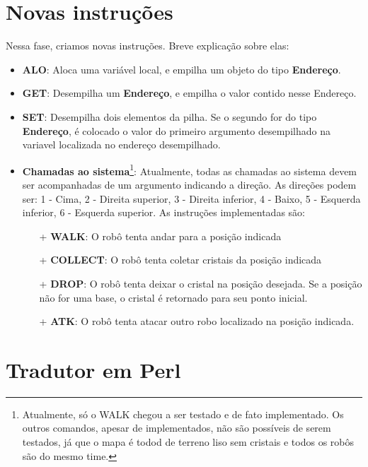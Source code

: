 \documentclass[11pt]{article}
\begin{document}
\section{Novas instruções}

Nessa fase, criamos novas instruções. Breve explicação sobre elas:

\begin{itemize}

	\item \textbf{ALO}: Aloca uma variável local, e empilha um objeto do tipo \textbf{\color{red}Endereço}.
	\item \textbf{GET}: Desempilha um \textbf{\color{red}Endereço}, e empilha o valor contido nesse Endereço.
	\item \textbf{SET}: Desempilha dois elementos da pilha. Se o segundo for do tipo \textbf{\color{red}Endereço},
	é colocado o valor do primeiro argumento desempilhado na variavel localizada no endereço desempilhado.
	\item \textbf{Chamadas ao sistema}\footnote{Atualmente, só o WALK chegou a ser testado e de fato implementado. Os outros comandos, apesar de implementados, não são possíveis de serem testados, já que o mapa é todod de terreno liso sem cristais e todos os robôs são do mesmo time.}: Atualmente, todas as chamadas ao sistema devem ser acompanhadas de um argumento indicando a direção. As direções podem ser: 1 - Cima, 2 - Direita superior, 3 - Direita inferior, 4 - Baixo, 5 - Esquerda inferior, 6 - Esquerda superior. As instruções implementadas são:
		\begin{itemize}

		\item[+] \textbf{WALK}: O robô tenta andar para a posição indicada
		\item[+] \textbf{COLLECT}: O robô tenta coletar cristais da posição indicada
		\item[+] \textbf{DROP}: O robô tenta deixar o cristal na posição desejada. Se a posição não for uma base, o cristal é retornado para seu ponto inicial.
		\item[+] \textbf{ATK}: O robô tenta atacar outro robo localizado na posição indicada.

		\end{itemize}

\end{itemize}


\section{Tradutor em Perl}
\end{document}
